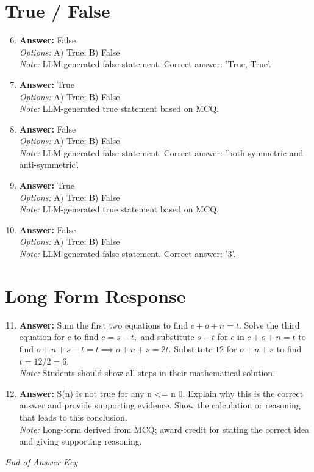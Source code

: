 \documentclass[12pt]{article}
\begin{document}
\section*{True / False}
\begin{enumerate}[label=\arabic*.]
\setcounter{enumi}{5}
\item \textbf{Answer:} False
\\ \textit{Options:} A) True; B) False
\\ \textit{Note:} LLM-generated false statement. Correct answer: 'True, True'.
\item \textbf{Answer:} True
\\ \textit{Options:} A) True; B) False
\\ \textit{Note:} LLM-generated true statement based on MCQ.
\item \textbf{Answer:} False
\\ \textit{Options:} A) True; B) False
\\ \textit{Note:} LLM-generated false statement. Correct answer: 'both symmetric and anti-symmetric'.
\item \textbf{Answer:} True
\\ \textit{Options:} A) True; B) False
\\ \textit{Note:} LLM-generated true statement based on MCQ.
\item \textbf{Answer:} False
\\ \textit{Options:} A) True; B) False
\\ \textit{Note:} LLM-generated false statement. Correct answer: '3'.
\end{enumerate}

\section*{Long Form Response}
\begin{enumerate}[label=\arabic*.]
\setcounter{enumi}{10}
\item \textbf{Answer:} Sum the first two equations to find $c+o+n=t.$ Solve the third equation for $c$ to find $c=s-t,$ and substitute $s-t$ for $c$ in $c+o+n=t$ to find $o+n+s-t=t\implies o+n+s=2 t.$ Substitute $12$ for $o+n+s$ to find $t=12/2=\boxed{6}.$
\\ \textit{Note:} Students should show all steps in their mathematical solution.
\item \textbf{Answer:} S(n) is not true for any n \textless{}= n 0. Explain why this is the correct answer and provide supporting evidence. Show the calculation or reasoning that leads to this conclusion.
\\ \textit{Note:} Long-form derived from MCQ; award credit for stating the correct idea and giving supporting reasoning.
\end{enumerate}

\vfill
\noindent\textit{End of Answer Key}
\end{document}
